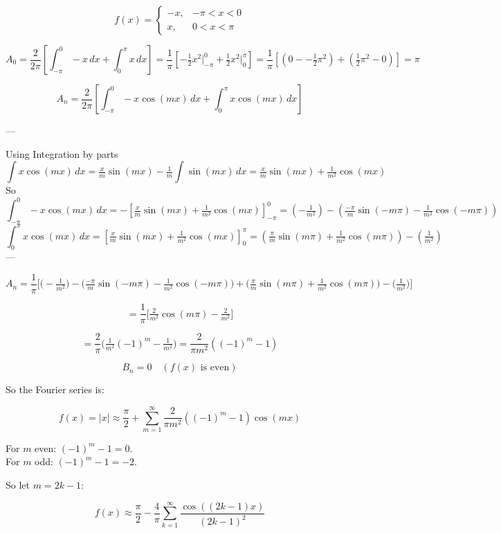 \documentclass[12pt]{article}
\begin{document}
\begin{enumerate}
\[
f(x) =
\begin{cases}
 -x, & -\pi < x < 0 \\
 x, & 0 < x < \pi
\end{cases}
\]

\[
A_0 = \frac{2}{2\pi} \left[ \int_{-\pi}^{0} -x \, dx + \int_{0}^{\pi} x \, dx \right]
= \frac{1}{\pi} \left[ -\tfrac{1}{2}x^2 \Big|_{-\pi}^{0} + \tfrac{1}{2}x^2 \Big|_{0}^{\pi} \right]
= \frac{1}{\pi} \left[ (0 - -\tfrac{1}{2}\pi^2) + (\tfrac{1}{2}\pi^2 - 0) \right] = \pi
\]

\[
A_n = \frac{2}{2\pi} \left[ \int_{-\pi}^0 -x \cos(mx)\, dx + \int_{0}^\pi x \cos(mx)\, dx \right]
\]

---

Using Integration by parts
\[
\int x \cos(mx)\, dx = \tfrac{x}{m}\sin(mx) - \tfrac{1}{m}\int \sin(mx)\, dx 
= \tfrac{x}{m}\sin(mx) + \tfrac{1}{m^2}\cos(mx)
\]
So
\[
\int_{-\pi}^0 -x\cos(mx)\, dx = -\left[\tfrac{x}{m}\sin(mx) + \tfrac{1}{m^2}\cos(mx)\right]_{-\pi}^0 = \left(- \tfrac{1}{m^2}\right)
- \left(\tfrac{-\pi}{m}\sin(-m\pi) - \tfrac{1}{m^2}\cos(-m\pi)\right)
\]
\[
\int_{0}^\pi x\cos(mx)\, dx = \left[\tfrac{x}{m}\sin(mx) + \tfrac{1}{m^2}\cos(mx)\right]_{0}^\pi = \left(\tfrac{\pi}{m}\sin(m\pi) + \tfrac{1}{m^2}\cos(m\pi)\right)-\left(\tfrac{1}{m^2}\right)
\]
---

\[
A_n = \frac{1}{\pi}\Bigg[ \Big(-\tfrac{1}{m^2}\Big) - \Big(\tfrac{-\pi}{m}\sin(-m\pi) - \tfrac{1}{m^2}\cos(-m\pi)\Big) 
+ \Big(\tfrac{\pi}{m}\sin(m\pi) + \tfrac{1}{m^2}\cos(m\pi)\Big) - \Big(\tfrac{1}{m^2}\Big)\Bigg]
\]

\[
= \frac{1}{\pi}\Big[\tfrac{2}{m^2}\cos(m\pi) - \tfrac{2}{m^2} \Big]
\]

\[
= \frac{2}{\pi}\Big( \tfrac{1}{m^2}(-1)^m - \tfrac{1}{m^2} \Big)
= \frac{2}{\pi m^2}\left((-1)^m - 1\right)
\]

\[
B_n = 0 \quad (\text{$f(x)$ is even})
\]

So the Fourier series is:

\[
f(x) = |x| \approx \frac{\pi}{2} + \sum_{m=1}^\infty \frac{2}{\pi m^2}\left((-1)^m - 1\right)\cos(mx)
\]

For \(m\) even: \((-1)^m - 1 = 0\). \\ 
For \(m\) odd: \((-1)^m - 1 = -2\).

So let $m=2k-1$:

\[f(x) \approx \frac{\pi}{2} - \frac{4}{\pi} \sum_{k=1}^\infty \frac{\cos((2k-1)x)}{(2k-1)^2} \]

\newpage


\end{enumerate}
\end{document}
